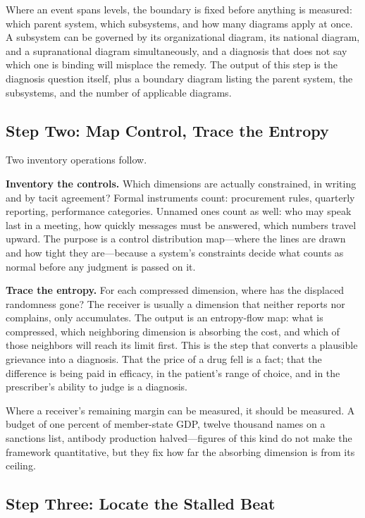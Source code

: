 \documentclass[11pt,a4paper]{article}
\begin{document}
Where an event spans levels, the boundary is fixed before anything is measured: which parent system, which subsystems, and how many diagrams apply at once. A subsystem can be governed by its organizational diagram, its national diagram, and a supranational diagram simultaneously, and a diagnosis that does not say which one is binding will misplace the remedy. The output of this step is the diagnosis question itself, plus a boundary diagram listing the parent system, the subsystems, and the number of applicable diagrams.

\subsection{Step Two: Map Control, Trace the Entropy}

Two inventory operations follow.

\textbf{Inventory the controls.} Which dimensions are actually constrained, in writing and by tacit agreement? Formal instruments count: procurement rules, quarterly reporting, performance categories. Unnamed ones count as well: who may speak last in a meeting, how quickly messages must be answered, which numbers travel upward. The purpose is a control distribution map---where the lines are drawn and how tight they are---because a system's constraints decide what counts as normal before any judgment is passed on it.

\textbf{Trace the entropy.} For each compressed dimension, where has the displaced randomness gone? The receiver is usually a dimension that neither reports nor complains, only accumulates. The output is an entropy-flow map: what is compressed, which neighboring dimension is absorbing the cost, and which of those neighbors will reach its limit first. This is the step that converts a plausible grievance into a diagnosis. That the price of a drug fell is a fact; that the difference is being paid in efficacy, in the patient's range of choice, and in the prescriber's ability to judge is a diagnosis.

Where a receiver's remaining margin can be measured, it should be measured. A budget of one percent of member-state GDP, twelve thousand names on a sanctions list, antibody production halved---figures of this kind do not make the framework quantitative, but they fix how far the absorbing dimension is from its ceiling.

\subsection{Step Three: Locate the Stalled Beat}
\end{document}
